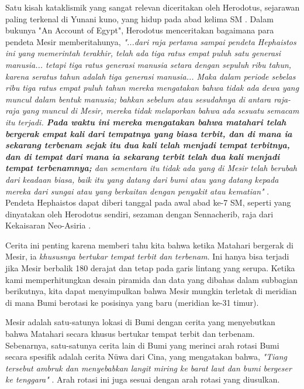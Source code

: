 \documentclass[10pt,twocolumn,letterpaper]{article}
\begin{document}
Satu kisah kataklismik yang sangat relevan diceritakan oleh Herodotus, sejarawan paling terkenal di Yunani kuno, yang hidup pada abad kelima SM \cite{31}. Dalam bukunya "An Account of Egypt", Herodotus menceritakan bagaimana para pendeta Mesir memberitahunya, \textit{"...dari raja pertama sampai pendeta Hephaistos ini yang memerintah terakhir, telah ada tiga ratus empat puluh satu generasi manusia... tetapi tiga ratus generasi manusia setara dengan sepuluh ribu tahun, karena seratus tahun adalah tiga generasi manusia... Maka dalam periode sebelas ribu tiga ratus empat puluh tahun mereka mengatakan bahwa tidak ada dewa yang muncul dalam bentuk manusia; bahkan sebelum atau sesudahnya di antara raja-raja yang muncul di Mesir, mereka tidak melaporkan bahwa ada sesuatu semacam itu terjadi. \textbf{Pada waktu ini mereka mengatakan bahwa matahari telah bergerak empat kali dari tempatnya yang biasa terbit, dan di mana ia sekarang terbenam sejak itu dua kali telah menjadi tempat terbitnya, dan di tempat dari mana ia sekarang terbit telah dua kali menjadi tempat terbenamnya;} dan sementara itu tidak ada yang di Mesir telah berubah dari keadaan biasa, baik itu yang datang dari bumi atau yang datang kepada mereka dari sungai atau yang berkaitan dengan penyakit atau kematian"} \cite{32}. Pendeta Hephaistos dapat diberi tanggal pada awal abad ke-7 SM, seperti yang dinyatakan oleh Herodotus sendiri, sezaman dengan Sennacherib, raja dari Kekaisaran Neo-Asiria \cite{32,33,34}.

Cerita ini penting karena memberi tahu kita bahwa ketika Matahari bergerak di Mesir, ia \textit{khususnya bertukar tempat terbit dan terbenam}. Ini hanya bisa terjadi jika Mesir berbalik 180 derajat dan tetap pada garis lintang yang serupa. Ketika kami memperhitungkan desain piramida dan data yang dibahas dalam subbagian berikutnya, kita dapat menyimpulkan bahwa Mesir mungkin terletak di meridian di mana Bumi berotasi ke posisinya yang baru (meridian ke-31 timur).

Mesir adalah satu-satunya lokasi di Bumi dengan cerita yang menyebutkan bahwa Matahari secara khusus bertukar tempat terbit dan terbenam. Sebenarnya, satu-satunya cerita lain di Bumi yang merinci arah rotasi Bumi secara spesifik adalah cerita Nüwa dari Cina, yang mengatakan bahwa, \textit{"Tiang tersebut ambruk dan menyebabkan langit miring ke barat laut dan bumi bergeser ke tenggara"} \cite{8}. Arah rotasi ini juga sesuai dengan arah rotasi yang diusulkan.
\end{document}
